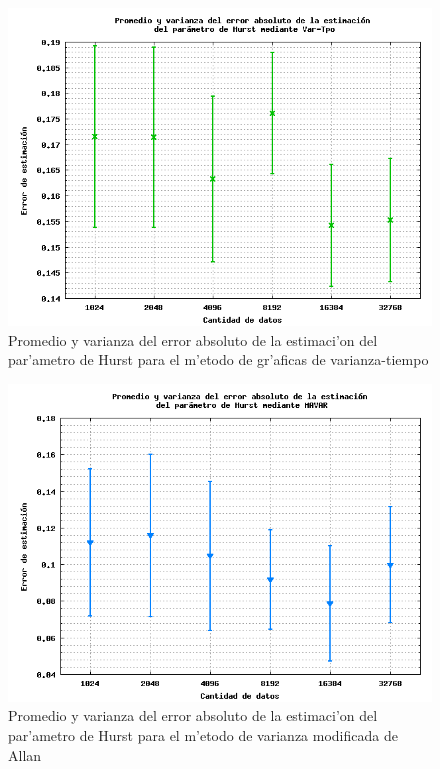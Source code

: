 \begin{figure}[htb]
\centering
\includegraphics[scale=0.45,type=png,ext=.png,read=.png]{figures/abserror-var}
\caption{Promedio y varianza del error absoluto de la estimaci'on del par'ametro
de Hurst para el m'etodo de gr'aficas de varianza-tiempo}
\label{fig:abserrvar}
\end{figure}

\begin{figure}[htb]
\centering
\includegraphics[scale=0.45,type=png,ext=.png,read=.png]{figures/abserror-mavar}
\caption{Promedio y varianza del error absoluto de la estimaci'on del par'ametro
de Hurst para el m'etodo de varianza modificada de Allan}
\label{fig:abserrmavar}
\end{figure}

